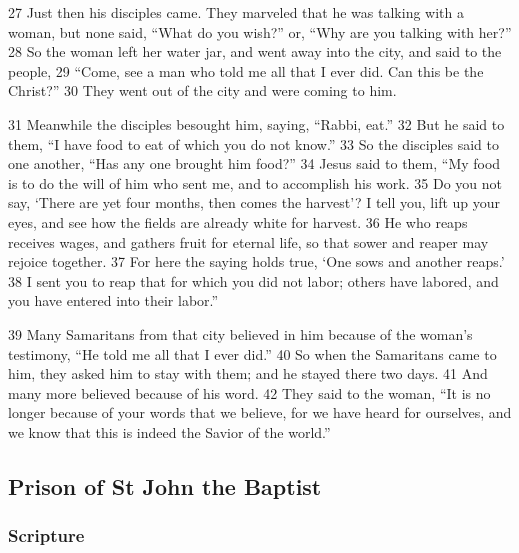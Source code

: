 \documentclass[letterpaper]{report}
\begin{document}
\begin{multicols}{2}
27 Just then his disciples came. They marveled that he was talking with a woman, but none said, “What do you wish?” or, “Why are you talking with her?” 28 So the woman left her water jar, and went away into the city, and said to the people, 29 “Come, see a man who told me all that I ever did. Can this be the Christ?” 30 They went out of the city and were coming to him.

31 Meanwhile the disciples besought him, saying, “Rabbi, eat.” 32 But he said to them, “I have food to eat of which you do not know.” 33 So the disciples said to one another, “Has any one brought him food?” 34 Jesus said to them, “My food is to do the will of him who sent me, and to accomplish his work. 35 Do you not say, ‘There are yet four months, then comes the harvest’? I tell you, lift up your eyes, and see how the fields are already white for harvest. 36 He who reaps receives wages, and gathers fruit for eternal life, so that sower and reaper may rejoice together. 37 For here the saying holds true, ‘One sows and another reaps.’ 38 I sent you to reap that for which you did not labor; others have labored, and you have entered into their labor.”

39 Many Samaritans from that city believed in him because of the woman’s testimony, “He told me all that I ever did.” 40 So when the Samaritans came to him, they asked him to stay with them; and he stayed there two days. 41 And many more believed because of his word. 42 They said to the woman, “It is no longer because of your words that we believe, for we have heard for ourselves, and we know that this is indeed the Savior of the world.”
\end{multicols}

\clearpage
\subsection{Prison of St John the Baptist}
\begin{multicols}{2}
	\mbox{}
\end{multicols}
\subsubsection{Scripture}
\end{document}
